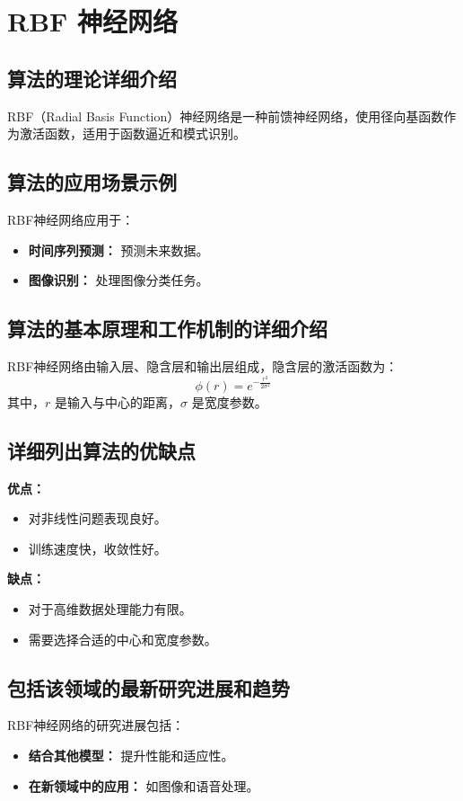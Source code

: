 \section{RBF 神经网络}
\subsection*{算法的理论详细介绍}
RBF（Radial Basis Function）神经网络是一种前馈神经网络，使用径向基函数作为激活函数，适用于函数逼近和模式识别。

\subsection*{算法的应用场景示例}
RBF神经网络应用于：
\begin{itemize}
    \item \textbf{时间序列预测：} 预测未来数据。
    \item \textbf{图像识别：} 处理图像分类任务。
\end{itemize}

\subsection*{算法的基本原理和工作机制的详细介绍}
RBF神经网络由输入层、隐含层和输出层组成，隐含层的激活函数为：
\[
    \phi(r) = e^{-\frac{r^2}{2\sigma^2}}
\]
其中，\(r\) 是输入与中心的距离，\(\sigma\) 是宽度参数。

\subsection*{详细列出算法的优缺点}
\textbf{优点：}
\begin{itemize}
    \item 对非线性问题表现良好。
    \item 训练速度快，收敛性好。
\end{itemize}

\textbf{缺点：}
\begin{itemize}
    \item 对于高维数据处理能力有限。
    \item 需要选择合适的中心和宽度参数。
\end{itemize}

\subsection*{包括该领域的最新研究进展和趋势}
RBF神经网络的研究进展包括：
\begin{itemize}
    \item \textbf{结合其他模型：} 提升性能和适应性。
    \item \textbf{在新领域中的应用：} 如图像和语音处理。
\end{itemize}
